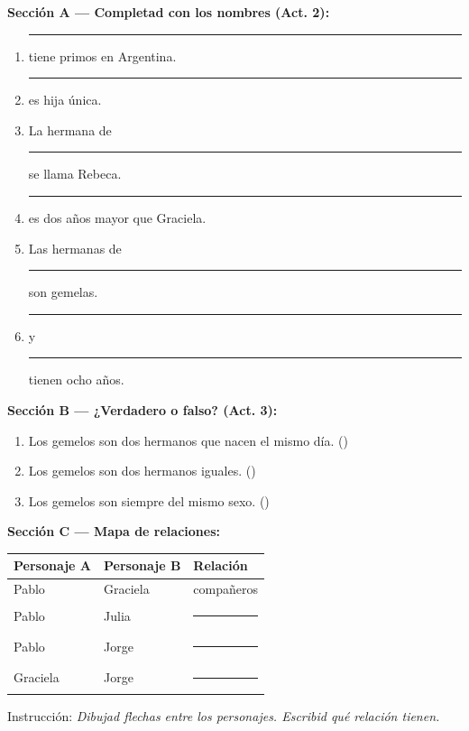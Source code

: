 \documentclass[a4paper,11pt]{article}
\begin{document}
\noindent\textbf{Sección A — Completad con los nombres (Act. 2):}
\begin{enumerate}[leftmargin=1.5cm, itemsep=3pt]
\item \rule{3cm}{0.4pt} tiene primos en Argentina.
\item \rule{3cm}{0.4pt} es hija única.
\item La hermana de \rule{3cm}{0.4pt} se llama Rebeca.
\item \rule{3cm}{0.4pt} es dos años mayor que Graciela.
\item Las hermanas de \rule{3cm}{0.4pt} son gemelas.
\item \rule{3cm}{0.4pt} y \rule{3cm}{0.4pt} tienen ocho años.
\end{enumerate}

\vspace{0.3cm}

\noindent\textbf{Sección B — ¿Verdadero o falso? (Act. 3):}
\begin{enumerate}[leftmargin=1.5cm, itemsep=3pt]
\item Los gemelos son dos hermanos que nacen el mismo día. (\quad)
\item Los gemelos son dos hermanos iguales. (\quad)
\item Los gemelos son siempre del mismo sexo. (\quad)
\end{enumerate}

\vspace{0.3cm}

\noindent\textbf{Sección C — Mapa de relaciones:}

\begin{center}
\renewcommand{\arraystretch}{1.5}
\begin{tabular}{|>{\centering\arraybackslash}p{3cm}|>{\centering\arraybackslash}p{3cm}|>{\centering\arraybackslash}p{5cm}|}
\hline
\rowcolor{violeta!15}
\textbf{Personaje A} & \textbf{Personaje B} & \textbf{Relación} \\
\hline
Pablo & Graciela & compañeros \\
\hline
Pablo & Julia & \rule{3cm}{0.4pt} \\
\hline
Pablo & Jorge & \rule{3cm}{0.4pt} \\
\hline
Graciela & Jorge & \rule{3cm}{0.4pt} \\
\hline
\end{tabular}
\end{center}

Instrucción: \textit{Dibujad flechas entre los personajes. Escribid qué relación tienen.}
\end{document}
